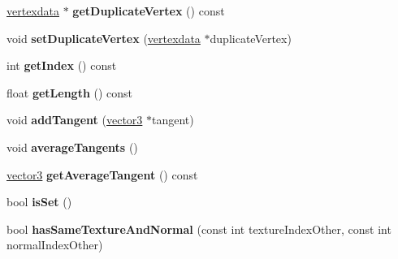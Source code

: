 \begin{DoxyCompactItemize}
\hyperlink{classflounder_1_1vertexdata}{vertexdata} $\ast$ {\bfseries get\+Duplicate\+Vertex} () const
\item 
\mbox{\label{classflounder_1_1vertexdata_a480b179725867cec7672db07d6b7101c}} 
void {\bfseries set\+Duplicate\+Vertex} (\hyperlink{classflounder_1_1vertexdata}{vertexdata} $\ast$duplicate\+Vertex)
\item 
\mbox{\label{classflounder_1_1vertexdata_ac007673ff0d25a84d2e01b4b39c2cc05}} 
int {\bfseries get\+Index} () const
\item 
\mbox{\label{classflounder_1_1vertexdata_a0db3cf4f5638aafc9ac25907b2e7c4cd}} 
float {\bfseries get\+Length} () const
\item 
\mbox{\label{classflounder_1_1vertexdata_a30bbe72d9f20899bca357a52b1b61b59}} 
void {\bfseries add\+Tangent} (\hyperlink{classflounder_1_1vector3}{vector3} $\ast$tangent)
\item 
\mbox{\label{classflounder_1_1vertexdata_a93b35e0e8387d6f530354df1bdeca6a5}} 
void {\bfseries average\+Tangents} ()
\item 
\mbox{\label{classflounder_1_1vertexdata_abff903e80172f43cb73ca83f67b6e974}} 
\hyperlink{classflounder_1_1vector3}{vector3} {\bfseries get\+Average\+Tangent} () const
\item 
\mbox{\label{classflounder_1_1vertexdata_ab176408a67cacb2af12d7c5ff9ea06ef}} 
bool {\bfseries is\+Set} ()
\item 
\mbox{\label{classflounder_1_1vertexdata_ab03f3d4ddd418cbfa474bfec3e82522c}} 
bool {\bfseries has\+Same\+Texture\+And\+Normal} (const int texture\+Index\+Other, const int normal\+Index\+Other)
\end{DoxyCompactItemize}
